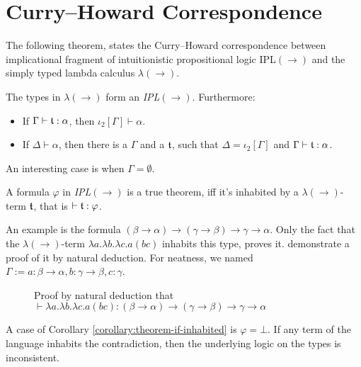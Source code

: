 \section{Curry--Howard Correspondence}

The following theorem, states the Curry--Howard correspondence between implicational fragment of intuitionistic propositional logic IPL$(\rightarrow)$ and the simply typed lambda calculus $\lambda(\rightarrow)$.

\begin{theorem}
The types in $\lambda(\rightarrow)$ form an \emph{IPL}$(\rightarrow)$. Furthermore:
\begin{itemize}
    \item If $\Gamma \vdash \mathfrak{t} : \alpha$, then $\iota_2[\Gamma] \vdash \alpha$.
    \item If $\Delta \vdash \alpha$, then there is a $\Gamma$ and a $\mathfrak{t}$, such that $\Delta = \iota_2[\Gamma]$ and $\Gamma \vdash \mathfrak{t} : \alpha$. \qedhere
\end{itemize}
\end{theorem}

An interesting case is when $\Gamma = \emptyset$.

\begin{corollary}
\label{corollary:theorem-if-inhabited}
A formula $\varphi$ in \emph{IPL}$(\rightarrow)$ is a true theorem, iff it's inhabited by a $\lambda(\rightarrow)$-term $\mathfrak{t}$, that is $\vdash \mathfrak{t} : \varphi$.
\end{corollary}

An example is the formula $(\beta \rightarrow \alpha) \rightarrow (\gamma \rightarrow \beta) \rightarrow \gamma \rightarrow \alpha$. Only the fact that the $\lambda(\rightarrow)$-term $\lambda a. \lambda b. \lambda c. a (b c)$ inhabits this type, proves it.  demonstrate a proof of it by natural deduction. For neatness, we named $\Gamma := a : \beta \rightarrow \alpha, b : \gamma \rightarrow \beta, c : \gamma$.

\begin{figure}
    \centering
    
    \caption{Proof by natural deduction that $\vdash \lambda a. \lambda b. \lambda c. a (b c) : (\beta \rightarrow \alpha) \rightarrow (\gamma \rightarrow \beta) \rightarrow \gamma \rightarrow \alpha$}
    \label{fig:curry-howard-example}
\end{figure}

A case of Corollary \ref{corollary:theorem-if-inhabited} is $\varphi = \bot$. If any term of the language inhabits the contradiction, then the underlying logic on the types is inconsistent.